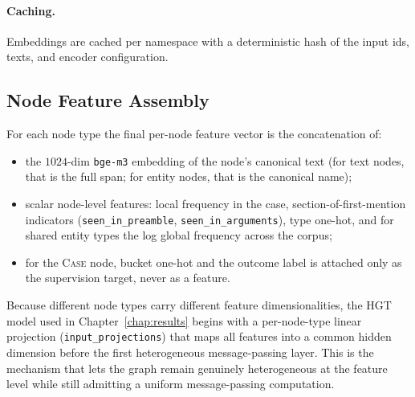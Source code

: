\paragraph{Caching.} Embeddings are cached per namespace with a
deterministic hash of the input ids, texts, and encoder configuration.


\subsection{Node Feature Assembly}

For each node type the final per-node feature vector is the
concatenation of:

\begin{sloppypar}
\begin{itemize}
  \item the $1024$-dim \texttt{bge-m3} embedding of the node's canonical
    text (for text nodes, that is the full span; for entity nodes,
    that is the canonical name);
  \item scalar node-level features: local frequency in the case,
    section-of-first-mention indicators (\texttt{seen\_in\_preamble},
    \texttt{seen\_in\_arguments}), type one-hot, and for shared entity
    types the log global frequency across the corpus;
  \item for the \textsc{Case} node, bucket one-hot and the outcome
    label is attached only as the supervision target, never as a
    feature.
\end{itemize}
\end{sloppypar}

Because different node types carry different feature dimensionalities,
the HGT model used in Chapter~\ref{chap:results} begins with a
per-node-type linear projection (\texttt{input\_projections}) that maps
all features into a common hidden dimension before the first
heterogeneous message-passing layer. This is the mechanism that lets
the graph remain genuinely heterogeneous at the feature level while
still admitting a uniform message-passing computation.
